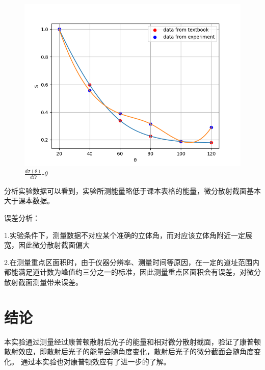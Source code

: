 \documentclass[font=default]{mpltx}
\begin{document}
\begin{figure}
  \centering
  \includegraphics[width=0.85\linewidth]{fig/figure_2.png}
  \caption{$\frac{d \sigma (\theta)}{d \Omega}$-$\theta$}
  \label{sec:figure_2}
\end{figure}

分析实验数据可以看到，实验所测能量略低于课本表格的能量，微分散射截面基本大于课本数据。

误差分析：

1.实验条件下，测量数据不对应某个准确的立体角，而对应该立体角附近一定展宽，因此微分散射截面偏大

2.在测量重点区面积时，由于仪器分辨率、测量时间等原因，在一定的道址范围内都能满足道计数为峰值约三分之一的标准，因此测量重点区面积会有误差，对微分散射截面测量带来误差。



\section{结论}
 本实验通过测量经过康普顿散射后光子的能量和相对微分散射截面，验证了康普顿散射效应，即散射后光子的能量会随角度变化，散射后光子的微分截面会随角度变化。
 通过本实验也对康普顿效应有了进一步的了解。
\end{document}
